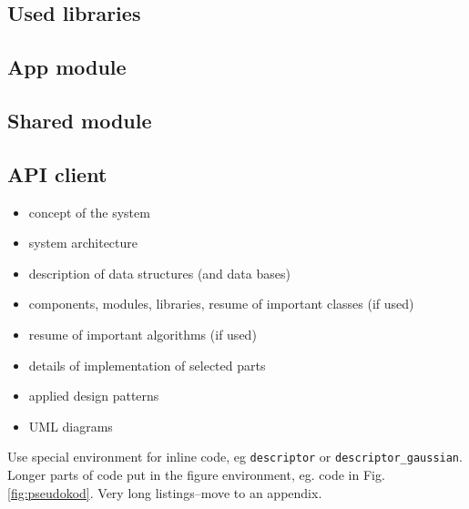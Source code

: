 \documentclass[a4paper,twoside,12pt]{book}
\begin{document}
\subsection{Used libraries}

\subsection{App module}

\subsection{Shared module}

\subsection{API client}

\begin{itemize}
\item concept of the system
\item system architecture
\item description of data structures (and data bases)
\item components, modules, libraries, resume of important classes (if used)
\item resume of important algorithms (if used)
\item details of implementation of selected parts
\item applied design patterns
\item UML diagrams
\end{itemize}


Use special environment for inline code, eg \lstinline|descriptor| or \lstinline|descriptor_gaussian|. 
Longer parts of code put in the figure environment, eg. code in Fig. \ref{fig:pseudokod}. Very long listings–move to an appendix.

      
      
\end{document}
